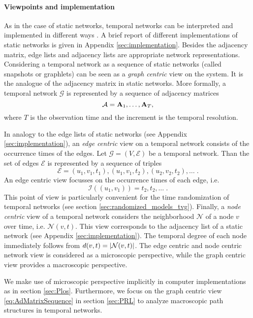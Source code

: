 \paragraph{Viewpoints and implementation\color{Cayenne}{.}}
As in the case of static networks, temporal networks can be interpreted and implemented in different ways \citep{Casteights_review}.
A brief report of different implementations of static networks is given in Appendix \ref{sec:implementation}.
Besides the adjacency matrix, edge lists and adjacency lists are appropriate network representations.
Considering a temporal network as a sequence of static networks (called snapshots or graphlets) can be seen as a \emph{graph centric} view on the system.
It is the analogue of the adjacency matrix in static networks.
More formally, a temporal network $\mathcal{G}$ is represented by a sequence of adjacency matrices
\begin{equation}\label{eq:AdMatrixSequence}
\mathcal{A}=\mathbf{A}_1,\dots ,\mathbf{A}_T,
\end{equation}
where $T$ is the observation time and the increment is the temporal resolution.

In analogy to the edge lists of static networks (see Appendix \ref{sec:implementation}), an \emph{edge centric} view on a temporal network consists of the occurrence times of the edges.
Let $\mathcal{G}=(V,\mathcal{E})$ be a temporal network.
Than the set of edges $\mathcal{E}$ is represented by a sequence of triples
\begin{equation*}%
\mathcal{E}=(u_1,v_1,t_1),(u_1,v_1,t_2),(u_2,v_2,t_2),\dots \;.
\end{equation*}
An edge centric view focusses on the occurrence times of each edge, i.e.
\[
\mathcal{I}((u_1,v_1))=t_2,t_2,\dots \; .
\]
This point of view is particularly convenient for the time randomization of temporal networks (see section \ref{sec:randomized_models_tvg}).
Finally, a \emph{node centric} view of a temporal network considers the neighborhood $\mathcal{N}$ of a node $v$ over time, i.e. $\mathcal{N}(v,t)$.
This view corresponds to the adjacency list of a static network (see Appendix \ref{sec:implementation}).
The temporal degree of each node immediately follows from $d(v,t)=\left| \mathcal{N}(v,t) \right|$.
The edge centric and node centric network view is considered as a microscopic perspective, while the graph centric view provides a macroscopic perspective.

We make use of microscopic perspective implicitly in computer implementations as in section \ref{sec:Plos}.
Furthermore, we focus on the graph centric view \eqref{eq:AdMatrixSequence} in section \ref{sec:PRL} to analyze macroscopic path structures in temporal networks.

